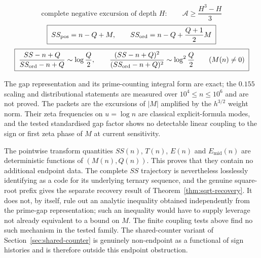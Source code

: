 \documentclass[11pt]{amsart}
\numberwithin{equation}{section}
\theoremstyle{plain}
\theoremstyle{definition}
\theoremstyle{remark}
\newcommand{\Mert}{M}
\begin{document}
\begin{equation}
\label{eq:summary-negative-energy}
\boxed{\;\text{complete negative excursion of depth }H:\qquad
\mathcal A\ge\frac{H^3-H}{3}\;}
\end{equation}
\begin{equation}
\label{eq:summary-nonprime-controls}
\boxed{\;SS_{\rm pos}=n-Q+M,\qquad
SS_{\rm ord}=n-Q+\frac{Q+1}{2}M\;}
\end{equation}
\begin{equation}
\label{eq:summary-prime-amplification}
\boxed{\;\frac{SS-n+Q}{SS_{\rm ord}-n+Q}\sim\log\frac Q2,
\qquad
\frac{(SS-n+Q)^2}{(SS_{\rm ord}-n+Q)^2}\sim\log^2\frac Q2
\qquad(\Mert(n)\ne0)\;}
\end{equation}

The gap representation and its prime-counting integral form are exact; the
$0.155$ scaling and distributional statements are measured over
$10^{4}\le n\le10^{6}$ and are not proved. The packets are the excursions of
$|M|$ amplified by the $h^{3/2}$ weight norm. Their zeta frequencies on
$u=\log n$ are classical explicit-formula modes, and the tested standardised
gap factor shows no detectable linear coupling to the sign or first zeta phase
of $M$ at current sensitivity.

The pointwise transform quantities $SS(n)$, $T(n)$, $E(n)$ and
$E_{\mathrm{mid}}(n)$ are deterministic functions of $(M(n),Q(n))$. This proves
that they contain no additional endpoint data.  The complete $SS$ trajectory is
nevertheless losslessly identifying as a code for its underlying ternary
sequence, and the genuine square-root prefix gives the separate recovery result
of Theorem~\ref{thm:sqrt-recovery}. It does not, by itself, rule out an
analytic inequality obtained independently from the prime-gap representation; such an
inequality would have to supply leverage not already equivalent to a bound on $M$. The
finite coupling tests above find no such mechanism in the tested family. The shared-counter
variant of Section~\ref{sec:shared-counter} is genuinely non-endpoint as a functional
of sign histories and is therefore outside this endpoint obstruction.

\clearpage

\end{document}
